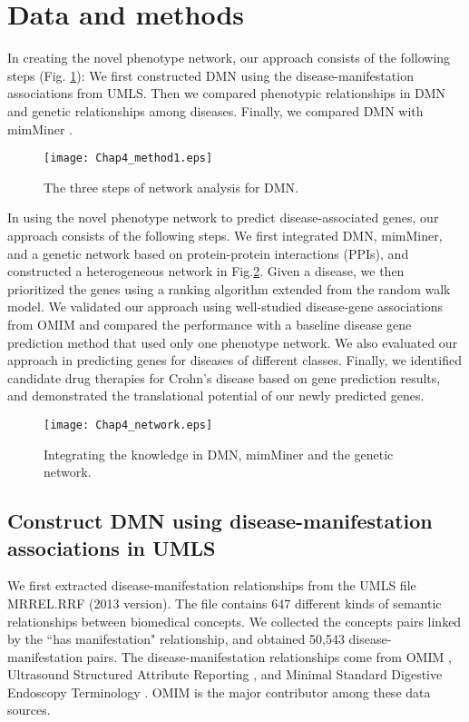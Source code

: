 \section{Data and methods}
In creating the novel phenotype network,
our approach consists of the following steps (Fig. \ref{dmnmethod}):
We first constructed DMN using the disease-manifestation associations from UMLS.
Then we compared phenotypic relationships in DMN and genetic relationships among diseases.
Finally, we compared DMN with mimMiner \cite{van2006text}.
  \begin{figure}[h!]
  \begin{center}
\texttt{[image: Chap4\_method1.eps]}
\end{center}
  \caption{The three steps of network analysis for DMN. }\label{dmnmethod}
  \end{figure}

In using the novel phenotype network to predict disease-associated genes,
our approach consists of the following steps.
We first integrated DMN, mimMiner, and
a genetic network based on protein-protein
interactions (PPIs), and constructed a heterogeneous network in Fig.\ref{multiphen_network}.
Given a disease, we then prioritized the genes using
a ranking algorithm extended from the random walk model.
We validated our approach using well-studied disease-gene associations from OMIM
and compared the performance with a baseline
disease gene prediction method that used only one
phenotype network.
We also evaluated our approach in predicting genes
for diseases of different classes.
Finally, we identified
candidate drug therapies for Crohn's disease based on gene prediction results,
and demonstrated the translational potential of
our newly predicted genes.
\begin{figure}[!t]
\centering
\texttt{[image: Chap4\_network.eps]}
\caption{Integrating the knowledge in DMN, mimMiner and the genetic network.}
\vspace{-.5cm}
\label{multiphen_network}
\end{figure}

\subsection{Construct DMN using disease-manifestation associations in UMLS}
We first extracted disease-manifestation relationships from the UMLS file MRREL.RRF (2013 version).
The file contains 647 different kinds of semantic relationships between biomedical concepts.
We collected the concepts pairs linked by the ``has manifestation" relationship,
and obtained 50,543 disease-manifestation pairs.
The disease-manifestation relationships come from OMIM \cite{hamosh2005online},
Ultrasound Structured Attribute Reporting \cite{bell1992form},
and Minimal Standard Digestive Endoscopy Terminology \cite{tringali2002integration}.
OMIM is the major contributor among these data sources.

